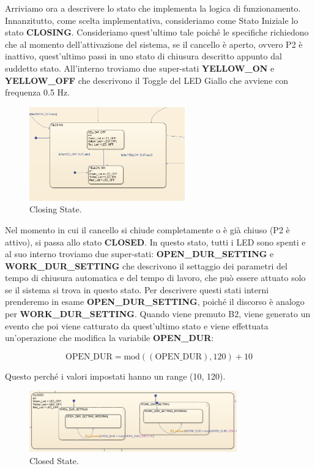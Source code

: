 \documentclass[12pt]{article}
\begin{document}
Arriviamo ora a descrivere lo stato che implementa la logica di funzionamento. Innanzitutto, come scelta implementativa, consideriamo come Stato Iniziale lo stato \textbf{CLOSING}. Consideriamo quest'ultimo tale poiché le specifiche richiedono che al momento dell'attivazione del sistema, se il cancello è aperto, ovvero P2 è inattivo, quest'ultimo passi in uno stato di chiusura descritto appunto dal suddetto stato. All'interno troviamo due super-stati \textbf{YELLOW\_ON} e \textbf{YELLOW\_OFF} che descrivono il Toggle del LED Giallo che avviene con frequenza 0.5 Hz.

\begin{figure}[H]
    \centering
    \includegraphics[width=0.6\textwidth]{imm/Closing.png}
    \caption{Closing State.}
\end{figure}

\noindent Nel momento in cui il cancello si chiude completamente o è già chiuso (P2 è attivo), si passa allo stato \textbf{CLOSED}. In questo stato, tutti i LED sono spenti e al suo interno troviamo due super-stati: \textbf{OPEN\_DUR\_SETTING} e \textbf{WORK\_DUR\_SETTING} che descrivono il settaggio dei parametri del tempo di chiusura automatica e del tempo di lavoro, che può essere attuato solo se il sistema si trova in questo stato. Per descrivere questi stati interni prenderemo in esame \textbf{OPEN\_DUR\_SETTING}, poiché il discorso è analogo per \textbf{WORK\_DUR\_SETTING}. Quando viene premuto B2, viene generato un evento che poi viene catturato da quest'ultimo stato e viene effettuata un'operazione che modifica la variabile \textbf{OPEN\_DUR}: 

\[
\mathrm{OPEN\_DUR} = \mathrm{mod}((\mathrm{OPEN\_DUR}), 120) + 10
\]

Questo perché i valori impostati hanno un range (10, 120).

\begin{figure}[H]
    \centering
    \includegraphics[width=0.8\textwidth]{imm/Closed.png}
    \caption{Closed State.}
\end{figure}
\end{document}
